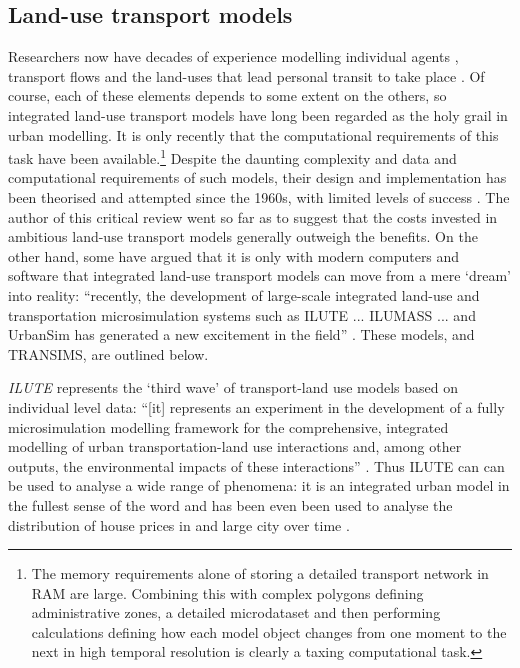 \subsection{Land-use transport models}
Researchers now have decades of experience modelling individual agents
\citep{Ortuzar1982},
transport flows \citep{Wilson1970} and the land-uses that lead personal
transit to take place \citep{batty1976urban}.
Of course, each of these elements depends to some extent on the others, so
integrated land-use transport models have long been regarded as the holy grail
in urban modelling. It is only recently that the computational
requirements of this task have been
available.\footnote{The memory requirements alone of storing a detailed
transport network in RAM are large. Combining this with complex polygons
defining administrative zones, a detailed microdataset and then performing
calculations defining how each model object changes from one moment to the next
in high temporal resolution is clearly a taxing computational task.
}
Despite the daunting complexity and data and computational requirements of such
models, their design and implementation has been theorised and attempted
since the 1960s, with limited levels of success
\citep{timmermans2003saga}. The author of this critical review went so far as
to suggest that the costs invested in ambitious land-use transport models
generally outweigh the benefits.
On the other hand, some have argued that it is only with modern computers and software
that integrated land-use transport models can move from a mere
`dream' \citep{timmermans2003saga}  into reality: ``recently,
the development of large-scale integrated land-use and
transportation microsimulation systems such as ILUTE ... ILUMASS
... and UrbanSim has generated a new excitement in the field'' \citep[p.~935]{Pinjari2011}.
These models, and TRANSIMS, are outlined below.


\emph{ILUTE}  represents the `third wave' of transport-land use
models based on individual level data:
``[it] represents an experiment in the development of a
fully microsimulation modelling
framework for the comprehensive, integrated modelling of urban transportation-land use
interactions and, among other outputs, the environmental impacts of these interactions''
\citep[p.~15]{timmermans2003saga}. Thus ILUTE can can be used to analyse a wide range
of phenomena: it is an integrated urban model in the fullest sense of the word
and has been even been used to analyse the distribution of house prices
in and large city over time \citep{Farooq2012-integreted}.

